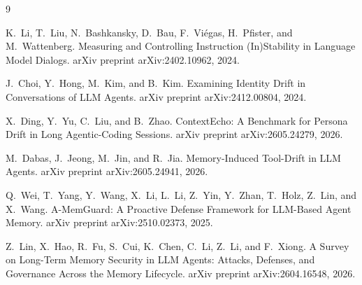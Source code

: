 \documentclass[11pt]{article}
\begin{document}
\begin{thebibliography}{9}
\footnotesize

K.~Li, T.~Liu, N.~Bashkansky, D.~Bau, F.~Vi\'egas, H.~Pfister, and M.~Wattenberg.
\newblock Measuring and Controlling Instruction (In)Stability in Language Model
Dialogs.
\newblock arXiv preprint arXiv:2402.10962, 2024.

J.~Choi, Y.~Hong, M.~Kim, and B.~Kim.
\newblock Examining Identity Drift in Conversations of LLM Agents.
\newblock arXiv preprint arXiv:2412.00804, 2024.

X.~Ding, Y.~Yu, C.~Liu, and B.~Zhao.
\newblock ContextEcho: A Benchmark for Persona Drift in Long Agentic-Coding Sessions.
\newblock arXiv preprint arXiv:2605.24279, 2026.

M.~Dabas, J.~Jeong, M.~Jin, and R.~Jia.
\newblock Memory-Induced Tool-Drift in LLM Agents.
\newblock arXiv preprint arXiv:2605.24941, 2026.

Q.~Wei, T.~Yang, Y.~Wang, X.~Li, L.~Li, Z.~Yin, Y.~Zhan, T.~Holz, Z.~Lin, and
X.~Wang.
\newblock A-MemGuard: A Proactive Defense Framework for LLM-Based Agent Memory.
\newblock arXiv preprint arXiv:2510.02373, 2025.

Z.~Lin, X.~Hao, R.~Fu, S.~Cui, K.~Chen, C.~Li, Z.~Li, and F.~Xiong.
\newblock A Survey on Long-Term Memory Security in LLM Agents: Attacks, Defenses, and
Governance Across the Memory Lifecycle.
\newblock arXiv preprint arXiv:2604.16548, 2026.

\end{thebibliography}
\end{document}
